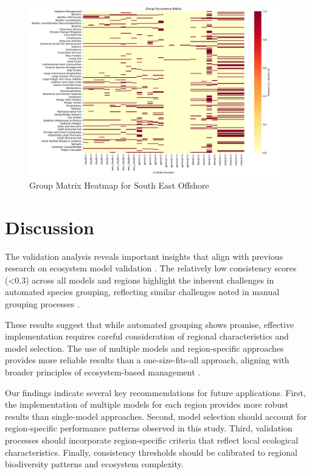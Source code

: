 \begin{figure}[H]
    \centering
    \includegraphics[width=\textwidth]{../Validation/SouthEastOffshore/reports/report_2024-12-11_17-35-20/group_matrix_heatmap.png}
    \caption{Group Matrix Heatmap for South East Offshore}
    \label{fig:seo_heatmap}
\end{figure}

\section{Discussion}

The validation analysis reveals important insights that align with previous research on ecosystem model validation \citep{Heymans2016, Link2010}. The relatively low consistency scores (<0.3) across all models and regions highlight the inherent challenges in automated species grouping, reflecting similar challenges noted in manual grouping processes \citep{PlaganyiButterworth2004}.

These results suggest that while automated grouping shows promise, effective implementation requires careful consideration of regional characteristics and model selection. The use of multiple models and region-specific approaches provides more reliable results than a one-size-fits-all approach, aligning with broader principles of ecosystem-based management \citep{Plaganyi2007}.

Our findings indicate several key recommendations for future applications. First, the implementation of multiple models for each region provides more robust results than single-model approaches. Second, model selection should account for region-specific performance patterns observed in this study. Third, validation processes should incorporate region-specific criteria that reflect local ecological characteristics. Finally, consistency thresholds should be calibrated to regional biodiversity patterns and ecosystem complexity.
